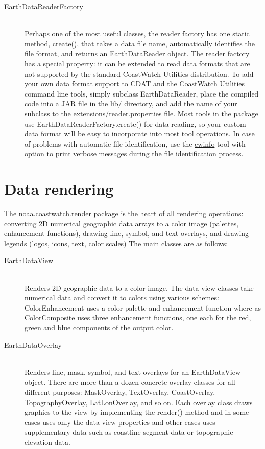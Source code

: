 {\begin{description}
\item[{\java EarthDataReaderFactory}]~\\ Perhaps one of the most
useful classes, the reader factory has one static method, {\java
create()}, that takes a data file name, automatically identifies
the file format, and returns an {\java EarthDataReader} object.
The reader factory has a special property: it can be extended to
read data formats that are not supported by the standard
CoastWatch Utilities distribution.  To add your own data format
support to CDAT and the CoastWatch Utilities command line tools,
simply subclass {\java EarthDataReader}, place the compiled code
into a JAR file in the {\file lib/} directory, and add the name
of your subclass to the {\file extensions/reader.properties}
file.  Most tools in the package use {\java
EarthDataReaderFactory.create()} for data reading, so your custom
data format will be easy to incorporate into most tool
operations.  In case of problems with automatic file
identification, use the \hyperlink{cwinfo}{cwinfo} tool with
 option to print verbose messages during the file
identification process.

\end{description}

\section{Data rendering}

The {\java noaa.coastwatch.render} package is the heart of all
rendering operations: converting 2D numerical geographic data
arrays to a color image (palettes, enhancement functions),
drawing line, symbol, and text overlays, and drawing legends
(logos, icons, text, color scales) The main classes are as
follows:
\begin{description}

\item[{\java EarthDataView}]~\\ Renders 2D geographic data to a
color image.  The data view classes take numerical data and
convert it to colors using various schemes: {\java
ColorEnhancement} uses a color palette and enhancement function
where as {\java ColorComposite} uses three enhancement functions,
one each for the red, green and blue components of the output
color.

\item[{\java EarthDataOverlay}]~\\ Renders line, mask, symbol,
and text overlays for an {\java EarthDataView} object.  There are
more than a dozen concrete overlay classes for all different
purposes: {\java MaskOverlay}, {\java TextOverlay}, {\java
CoastOverlay}, {\java TopographyOverlay}, {\java LatLonOverlay},
and so on.  Each overlay class draws graphics to the view by
implementing the {\java render()} method and in some cases uses
only the data view properties and other cases uses supplementary
data such as coastline segment data or topographic elevation
data.


\end{description}}

